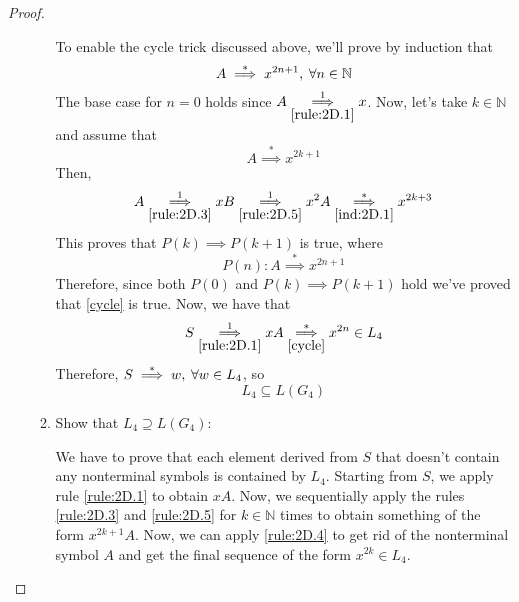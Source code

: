 \documentclass[11pt]{article}
\begin{document}
\begin{proof}
\begin{enumerate}
\begin{enumerate}
            To enable the cycle trick discussed above,
            we'll prove by induction that 
            \begin{equation}\label{cycle}
                A \overset{*}{\implies} x^{2n + 1}, \hspace{0.25em} \forall n \in \mathbb{N}
            \end{equation}
            The base case for $n=0$ holds since $A \overset{1}{\underset{\eqref{rule:2D.1}}{\implies}} x$.
            Now, let's take $k \in \mathbb{N}$ and assume that
            \begin{equation}\label{ind:2D.1}
                A \overset{*}{\implies} x^{2k + 1}
            \end{equation}
            Then,
            \[
                A \overset{1}{\underset{\eqref{rule:2D.3}}{\implies}} xB
                \overset{1}{\underset{\eqref{rule:2D.5}}{\implies}} x^2A
                \overset{*}{\underset{\eqref{ind:2D.1}}{\implies}} x^{2k + 3}
            \] 
            This proves that $P(k) \implies P(k + 1)$ is true, where 
             \[
                 P(n): A \overset{*}{\implies} x^{2n + 1}
            \] 
            Therefore, since both $P(0)$ and $P(k) \implies P(k + 1)$ hold we've proved 
            that \eqref{cycle} is true. Now, we have that
            \[
                S \overset{1}{\underset{\eqref{rule:2D.1}}{\implies}} xA
                \overset{*}{\underset{\eqref{cycle}}{\implies}} x^{2n} \in L_4
            \] 
            Therefore, $S \overset{*}{\implies} w, \hspace{0.25em} \forall w \in L_4$, so
            \begin{equation}\label{incl:2D.1}
                L_4 \subseteq L(G_4)
            \end{equation}

            \vspace{1em}

            \item Show that $L_4 \supseteq L(G_4)$:

            We have to prove that each element derived from $S$ that doesn't contain
            any nonterminal symbols is contained by $L_4$. Starting from $S$, we 
            apply rule \eqref{rule:2D.1} to obtain $xA$. Now, we sequentially apply
            the rules \eqref{rule:2D.3} and \eqref{rule:2D.5} for $k \in \mathbb{N}$ 
            times to obtain something of the form $x^{2k + 1}A$. Now, we can
            apply \eqref{rule:2D.4} to get rid of the nonterminal symbol $A$ and
            get the final sequence of the form $x^{2k} \in L_4$.


\end{enumerate}
\end{enumerate}
\end{proof}
\end{document}
